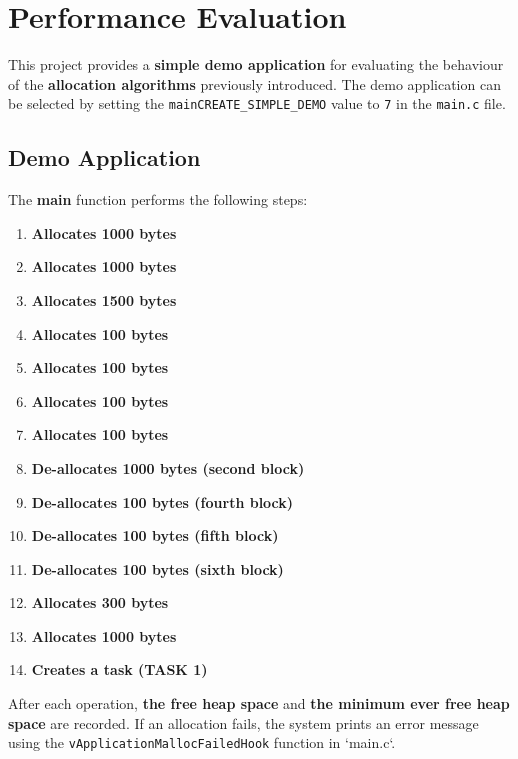 \section{Performance Evaluation}
\label{sec: Performance Evaluation}
This project provides a \textbf{simple demo application} for evaluating the behaviour of the \textbf{allocation algorithms} previously introduced.
The demo application can be selected by setting the \texttt{mainCREATE\_SIMPLE\_DEMO} value to \texttt{7} in the \texttt{main.c} file. 


\subsection{Demo Application}
\label{subsec: Mem Mang Demo App}
The \textbf{main} function performs the following steps:
\begin{multicols}{2} %
\begin{enumerate}
    \item \textbf{Allocates 1000 bytes}
    \item \textbf{Allocates 1000 bytes}
    \item \textbf{Allocates 1500 bytes}
    \item \textbf{Allocates 100 bytes}
    \item \textbf{Allocates 100 bytes}
    \item \textbf{Allocates 100 bytes}
    \item \textbf{Allocates 100 bytes}
    \item \textbf{De-allocates 1000 bytes (second block)}
    \item \textbf{De-allocates 100 bytes (fourth block)}
    \item \textbf{De-allocates 100 bytes (fifth block)}
    \item \textbf{De-allocates 100 bytes (sixth block)}
    \item \textbf{Allocates 300 bytes}
    \item \textbf{Allocates 1000 bytes}
    \item \textbf{Creates a task (TASK 1)}
\end{enumerate}
\end{multicols}

After each operation, \textbf{the free heap space} and \textbf{the minimum ever free heap space} are recorded. If an allocation fails, the system prints an error message using the \texttt{vApplicationMallocFailedHook} function in `main.c`.

